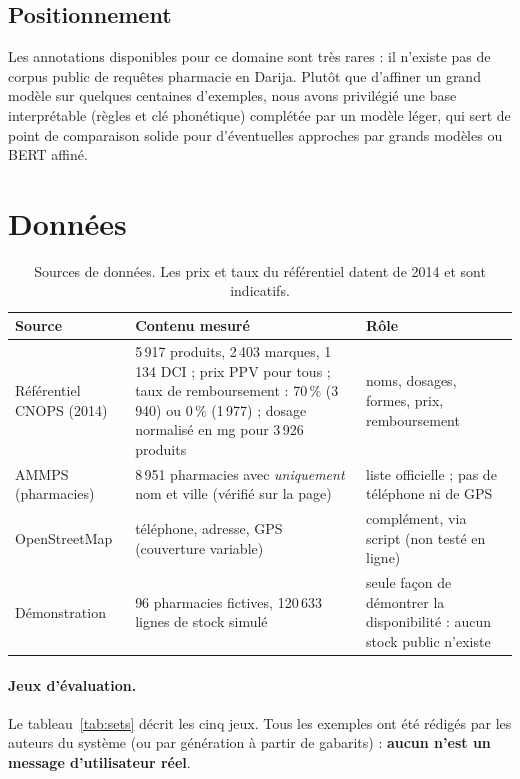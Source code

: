 \documentclass[11pt,a4paper]{article}
\begin{document}
\subsection{Positionnement}
Les annotations disponibles pour ce domaine sont tr\`es rares : il n'existe pas de corpus public de requ\^etes pharmacie en Darija. Plut\^ot que d'affiner un grand mod\`ele sur quelques centaines d'exemples, nous avons privil\'egi\'e une base interpr\'etable (r\`egles et cl\'e phon\'etique) compl\'et\'ee par un mod\`ele l\'eger, qui sert de point de comparaison solide pour d'\'eventuelles approches par grands mod\`eles ou BERT affin\'e.

\section{Donn\'ees}
\begin{table}[htbp]\centering\small
\begin{tabular}{@{}p{3.4cm}p{6.2cm}p{4.6cm}@{}}\toprule
\textbf{Source} & \textbf{Contenu mesur\'e} & \textbf{R\^ole}\\\midrule
R\'ef\'erentiel CNOPS (2014) & 5\,917 produits, 2\,403 marques, 1\,134 DCI ; prix PPV pour tous ; taux de remboursement : 70\,\% (3\,940) ou 0\,\% (1\,977) ; dosage normalis\'e en mg pour 3\,926 produits & noms, dosages, formes, prix, remboursement\\
AMMPS (pharmacies) & 8\,951 pharmacies avec \emph{uniquement} nom et ville (v\'erifi\'e sur la page) & liste officielle ; pas de t\'el\'ephone ni de GPS\\
OpenStreetMap & t\'el\'ephone, adresse, GPS (couverture variable) & compl\'ement, via script (non test\'e en ligne)\\
D\'emonstration & 96 pharmacies fictives, 120\,633 lignes de stock simul\'e & seule fa\c{c}on de d\'emontrer la disponibilit\'e : aucun stock public n'existe\\\bottomrule
\end{tabular}
\caption{Sources de donn\'ees. Les prix et taux du r\'ef\'erentiel datent de 2014 et sont indicatifs.}
\end{table}

\paragraph{Jeux d'\'evaluation.} Le tableau~\ref{tab:sets} d\'ecrit les cinq jeux. Tous les exemples ont \'et\'e r\'edig\'es par les auteurs du syst\`eme (ou par g\'en\'eration \`a partir de gabarits) : \textbf{aucun n'est un message d'utilisateur r\'eel}.
\end{document}
